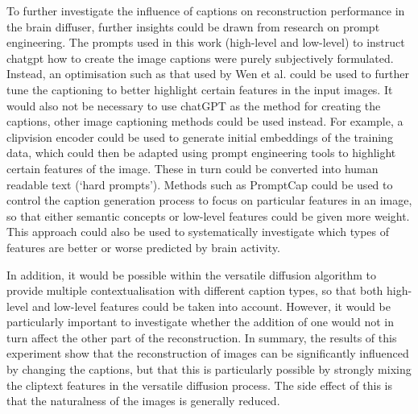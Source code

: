 To further investigate the influence of captions on reconstruction performance in the brain diffuser, further insights could be drawn from research on prompt engineering. The prompts used in this work (high-level and low-level) to instruct chatgpt how to create the image captions were purely subjectively formulated. Instead, an optimisation such as that used by Wen et al.\cite{wenHardPromptsMade2023} could be used to further tune the captioning to better highlight certain features in the input images. It would also not be necessary to use chatGPT as the method for creating the captions, other image captioning methods could be used instead. For example, a clipvision encoder could be used to generate initial embeddings of the training data, which could then be adapted using prompt engineering tools to highlight certain features of the image. These in turn could be converted into human readable text (`hard prompts')\cite{wenHardPromptsMade2023}. Methods such as PromptCap\cite{Hu_2023_ICCV} could be used to control the caption generation process to focus on particular features in an image, so that either semantic concepts or low-level features could be given more weight. This approach could also be used to systematically investigate which types of features are better or worse predicted by brain activity. 

In addition, it would be possible within the versatile diffusion algorithm\cite{xuVersatileDiffusionText2024} to provide multiple contextualisation with different caption types, so that both high-level and low-level features could be taken into account. However, it would be particularly important to investigate whether the addition of one would not in turn affect the other part of the reconstruction. In summary, the results of this experiment show that the reconstruction of images can be significantly influenced by changing the captions, but that this is particularly possible by strongly mixing the cliptext features in the versatile diffusion process. The side effect of this is that the naturalness of the images is generally reduced. 


